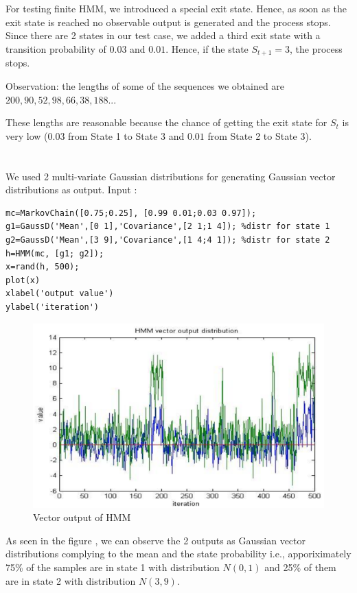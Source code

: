 \section{} %
For testing finite HMM, we introduced a special exit state. Hence, as soon as the exit state is reached no observable output is generated and the process stops. Since there are 2 states in our test case, we added a third exit state with a transition probability of $0.03$ and $0.01$. Hence, if the state $S_{t+1} = 3$, the process stops.

Observation: the lengths of some of the sequences we obtained are $200, 90, 52, 98, 66, 38, 188$...

These lengths are reasonable because the chance of getting the exit state for $S_t$ is very low ($0.03$ from State 1 to State 3 and $0.01$ from State 2 to State 3).

\section{} %
We used 2 multi-variate Gaussian distributions for generating Gaussian vector distributions as output.
Input :
\begin{verbatim}
mc=MarkovChain([0.75;0.25], [0.99 0.01;0.03 0.97]);
g1=GaussD('Mean',[0 1],'Covariance',[2 1;1 4]); %distr for state 1
g2=GaussD('Mean',[3 9],'Covariance',[1 4;4 1]); %distr for state 2
h=HMM(mc, [g1; g2]);
x=rand(h, 500);
plot(x)
xlabel('output value')
ylabel('iteration')
\end{verbatim}

\begin{figure}[H]
	\caption{Vector output of HMM}
	\label{fig:question_7_double_values}
	\centering
	\includegraphics[width=.9\linewidth]{images/question_7_double_values}
\end{figure}

As seen in the figure , we can observe the 2 outputs as Gaussian vector distributions complying to the mean and the state probability i.e., apporiximately 75\% of the samples are in state 1 with distribution $N(0,1)$ and 25\% of them are in state 2 with distribution $N(3,9)$.
